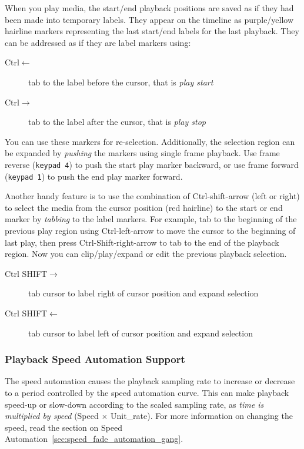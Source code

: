 When you play media, the start/end playback positions are saved as if they had been made into temporary labels.  
They appear on the timeline as purple/yellow hairline markers representing the last start/end labels for the last playback. 
They can be addressed as if they are label markers using:

\begin{description}
    \item[Ctrl$\leftarrow$]   tab to the label before the cursor, that is \textit{play start}
    \item[Ctrl$\rightarrow$]   tab to the label after the cursor, that is \textit{play stop}
\end{description}


You can use these markers for re-selection.  
Additionally, the selection region can be expanded by \textit{pushing} the markers using single frame playback.  
Use frame reverse (\texttt{keypad 4}) to push the start play marker backward, or use frame forward (\texttt{keypad 1}) to push the end play marker forward.

Another handy feature is to use the combination of Ctrl-shift-arrow (left or right) to select the media from the cursor position (red hairline) to the start or end marker by \textit{tabbing} to the label markers.  
For example, tab to the beginning of the previous play region using Ctrl-left-arrow to move the cursor to the beginning of last play, then press Ctrl-Shift-right-arrow to tab to the end of the playback region. 
Now you can clip/play/expand or edit the previous playback selection.

\begin{description}
    \item[Ctrl SHIFT$\rightarrow$] 	  tab cursor to label right of cursor position and expand selection
    \item[Ctrl SHIFT$\leftarrow$] 	  tab cursor to label left of cursor position and expand selection
\end{description}


\subsubsection*{Playback Speed Automation Support}%
\label{ssub:playback_speed_automation_support}

The speed automation causes the playback sampling rate to increase or decrease to a period controlled by the speed automation curve.  
This can make playback speed-up or slow-down according to the scaled sampling rate, as \textit{time is multiplied by speed} (Speed $\times$ Unit\_rate). For more information on changing
the speed, read the section on Speed Automation~\ref{sec:speed_fade_automation_gang}.

